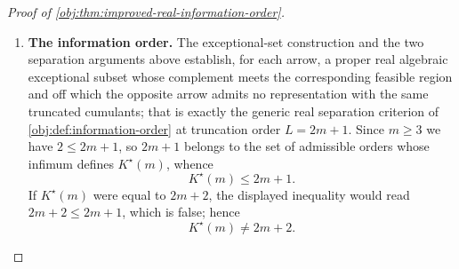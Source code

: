 \documentclass[11pt]{article}
\begin{document}
\begin{proof}[Proof of \cref{obj:thm:improved-real-information-order}]
\begin{enumerate}
\item \textbf{The information order.}  The exceptional-set construction and the two separation arguments above establish, for each arrow, a proper real algebraic exceptional subset whose complement meets the corresponding feasible region and off which the opposite arrow admits no representation with the same truncated cumulants; that is exactly the generic real separation criterion of \cref{obj:def:information-order} at truncation order \(L=2m+1\).  Since \(m\ge3\) we have \(2\le 2m+1\), so \(2m+1\) belongs to the set of admissible orders whose infimum defines \(K^\star(m)\), whence
\[
K^\star(m)\le 2m+1 .
\]
If \(K^\star(m)\) were equal to \(2m+2\), the displayed inequality would read \(2m+2\le 2m+1\), which is false; hence
\[
K^\star(m)\ne 2m+2 .
\]
\end{enumerate}
\end{proof}
\end{document}
